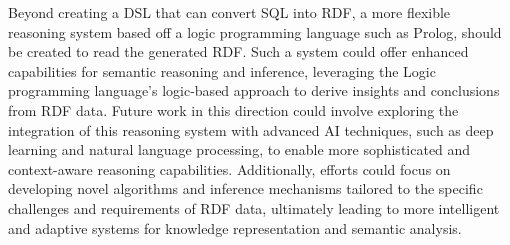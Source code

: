 Beyond creating a DSL that can convert SQL into RDF, a more flexible reasoning system based off a logic programming language such as Prolog, should be created to read the generated RDF.  Such a system could offer enhanced capabilities for semantic reasoning and inference, leveraging the Logic programming language's logic-based approach to derive insights and conclusions from RDF data. Future work in this direction could involve exploring the integration of this reasoning system with advanced AI techniques, such as deep learning and natural language processing, to enable more sophisticated and context-aware reasoning capabilities. Additionally, efforts could focus on developing novel algorithms and inference mechanisms tailored to the specific challenges and requirements of RDF data, ultimately leading to more intelligent and adaptive systems for knowledge representation and semantic analysis.

